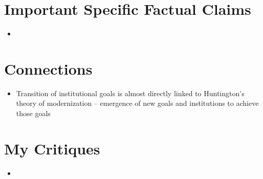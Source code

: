 \documentclass[12pt]{article}
\begin{document}
\section{Important Specific Factual Claims}

\begin{itemize}[leftmargin=*, itemsep=4pt]
    \item
\end{itemize}


\section{Connections}

\begin{itemize}[leftmargin=*, itemsep=4pt]
    \item Transition of institutional goals is almost directly linked to Huntington's theory of modernization -- emergence of new goals and institutions to achieve those goals
\end{itemize}


\section{My Critiques}

\begin{itemize}[leftmargin=*, itemsep=4pt]
    \item
\end{itemize}
\end{document}
